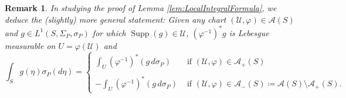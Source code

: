 \documentclass[11pt]{article}
\newtheorem{remark}{Remark}
\newcommand\supp{\operatorname{Supp}}
\begin{document}
\begin{remark}\label{rmk:LocalIntegralFormula}
In studying the proof of Lemma \ref{lem:LocalIntegralFormula}, we deduce the (slightly) more general statement: Given any chart $(\mathcal{U},\varphi)\in\mathcal{A}(S)$ and $g\in L^1(S,\Sigma_P,\sigma_P)$ for which $\supp(g)\in\mathcal{U}$, $(\varphi^{-1})^*g$ is Lebesgue measurable on $U=\varphi(\mathcal{U})$ and 
\begin{equation*}
    \int_S g(\eta)\sigma_P(d\eta)=\begin{cases}
    \displaystyle\int_U(\varphi^{-1})^*(g\,d\sigma_P) &\mbox{ if }(\mathcal{U},\varphi)\in\mathcal{A}_+(S)\\
    &\\
    -\displaystyle\int_U(\varphi^{-1})^*(g\,d\sigma_P)&\mbox{ if }(\mathcal{U},\varphi)\in\mathcal{A}_-(S)\coloneqq\mathcal{A}(S)\setminus\mathcal{A}_+(S).
    \end{cases}
\end{equation*}
\end{remark}
\end{document}
